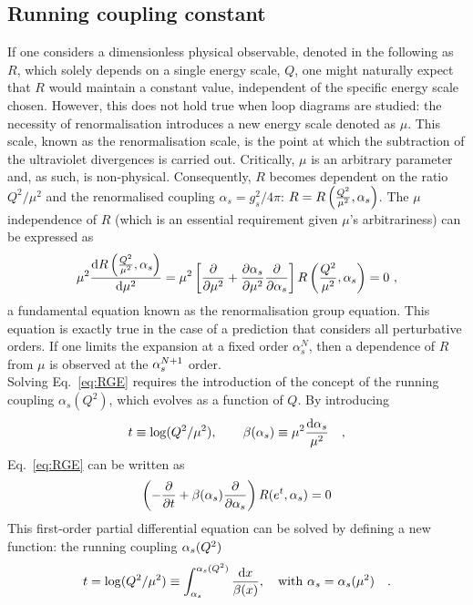 \subsection{Running coupling constant}
If one considers a dimensionless physical observable, denoted in the following as $R$, which solely depends on a single energy scale, $Q$, one might naturally expect that $R$ would maintain a constant value, independent of the specific energy scale chosen. However, this does not hold true when loop diagrams are studied: the necessity of renormalisation introduces a new energy scale denoted as $\mu$. This scale, known as the renormalisation scale, is the point at which the subtraction of the ultraviolet divergences is carried out. Critically, $\mu$ is an arbitrary parameter and, as such, is non-physical. Consequently, $R$ becomes dependent on the ratio $Q^2/\mu^2$ and the renormalised coupling $\alpha_s = g_s^2/4\pi$: $R = R\left(\frac{Q^2}{\mu^2},\alpha_s\right)$. The $\mu$ independence of $R$ (which is an essential requirement given $\mu$'s arbitrariness) can be expressed as
\begin{equation}\label{eq:RGE}
    \mu^2 \frac{\mathrm{d} R\left(\frac{Q^2}{\mu^2},\alpha_s\right)}{\mathrm{d} \mu^2} = \mu^2 \left[\frac{\partial}{\partial\mu^2}+\frac{\partial \alpha_s}{\partial\mu^2}\frac{\partial}{\partial\alpha_s}\right]R\left(\frac{Q^2}{\mu^2},\alpha_s\right) = 0\ , 
\end{equation}
a fundamental equation known as the renormalisation group equation. This equation is exactly true in the case of a prediction that considers all perturbative orders. If one limits the expansion at a fixed order $\alpha_s^N$, then a dependence of $R$ from $\mu$ is observed at the $\alpha_s^{N+1}$ order.\\ Solving Eq.~\ref{eq:RGE} requires the introduction of the concept of the running coupling $\alpha_s(Q^2)$, which evolves as a function of $Q$. By introducing
\begin{equation*}
    t\equiv \mathrm{log}(Q^2/\mu^2), \qquad \beta(\alpha_s)\equiv \mu^2 \frac{\mathrm{d}\alpha_s}{\mathrm{\mu^2}}\quad ,
\end{equation*}
Eq.~\ref{eq:RGE} can be written as
\begin{equation*}
    \left(-\frac{\partial}{\partial t} + \beta(\alpha_s)\frac{\partial}{\partial \alpha_s}\right) R(e^t,\alpha_s) = 0
\end{equation*}
This first-order partial differential equation can be solved by defining a new function: the running coupling $\alpha_s(Q^2)$
\begin{equation}\label{eq:t_integral}
    t = \mathrm{log}(Q^2/\mu^2) \equiv \int_{\alpha_s}^{\alpha_s(Q^2)} \frac{\mathrm{d} x}{\beta(x)} , \quad \mathrm{with}~\alpha_s=\alpha_s(\mu^2)\quad .
\end{equation}
